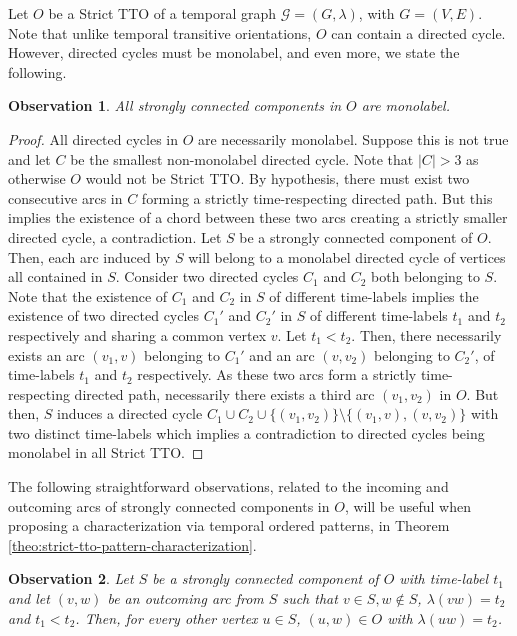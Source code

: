\documentclass[runningheads]{llncs}
\newtheorem{obs}{Observation}
\begin{document}
Let $O$ be a Strict TTO of a temporal graph $\mathcal{G}=(G,\lambda)$, with $G=(V,E)$. Note that unlike temporal transitive orientations, $O$ can contain a directed cycle. However, directed cycles must be monolabel, and even more, we state the following.

\begin{obs}
All strongly connected components in $O$ are monolabel.
\label{obs:strongly-connected-comp-labels-strict} 
\end{obs}

\begin{proof}
All directed cycles in $O$ are necessarily monolabel. Suppose this is not true and let $C$ be the smallest non-monolabel directed cycle. Note that $|C| > 3$ as otherwise $O$ would not be Strict TTO. By hypothesis, there must exist two consecutive arcs in $C$ forming a strictly time-respecting directed path. But this implies the existence of a chord between these two arcs creating a strictly smaller directed cycle, a contradiction. Let $S$ be a strongly connected component of $O$. Then, each arc induced by $S$ will belong to a monolabel directed cycle of vertices all contained in $S$. Consider two directed cycles $C_{1}$ and $C_{2}$ both belonging to $S$. Note that the existence of $C_{1}$ and $C_{2}$ in $S$ of different time-labels implies the existence of two directed cycles $C_{1}'$ and $C_{2}'$ in $S$ of different time-labels $t_1$ and $t_2$ respectively and sharing a common vertex $v$. Let $t_1 < t_2$. Then, there necessarily exists an arc $(v_1,v)$ belonging to $C_1'$ and an arc $(v,v_2)$ belonging to $C_2'$, of time-labels $t_1$ and $t_2$ respectively. As these two arcs form a strictly time-respecting directed path, necessarily there exists a third arc $(v_1,v_2)$ in $O$. But then, $S$ induces a directed cycle $C_1 \cup C_2 \cup \{(v_1,v_2)\} \setminus \{(v_1,v),(v,v_2)\}$ with two distinct time-labels which implies a contradiction to directed cycles being monolabel in all Strict TTO.
\end{proof}


The following straightforward observations, related to the incoming and outcoming arcs of strongly connected components in $O$, will be useful when proposing a characterization via temporal ordered patterns, in Theorem \ref{theo:strict-tto-pattern-characterization}.

\begin{obs}
Let $S$ be a strongly connected component of $O$ with time-label $t_{1}$ and let $(v,w)$ be an outcoming arc from $S$ such that $v \in S, w \notin S$, $\lambda(vw) = t_2$ and $t_{1} < t_{2}$. Then, for every other vertex $u \in S$, $(u,w) \in O$ with $\lambda(uw) = t_{2}$.
\label{obs:connected-component-outcoming-arcs}
\end{obs}
\end{document}
